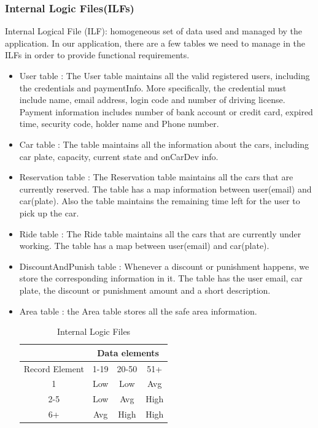 \documentclass{article}
\begin{document}
	\subsubsection{Internal Logic Files(ILFs)}
	Internal Logical File (ILF): homogeneous set of data used and managed by the application.
	In our application, there are a few tables we need to manage in the ILFs in order to provide functional requirements.
    \begin{itemize}
    	\item User table : The User table maintains all the valid registered users, including the credentials and paymentInfo. More specifically, the credential must include name, email address, login code and number of driving license. Payment information includes number of bank 
    	account or credit card, expired time, security code, holder name and Phone number.
    	
    	\item Car table : The table maintains all the information about the cars, including car plate, capacity, current state and onCarDev info. 
    	
    	\item Reservation table : The Reservation table maintains all the cars that are currently reserved. The table has a map information between user(email) and car(plate). Also the table maintains the remaining time left for the user to pick up the car.
    	
    	\item Ride table : The Ride table maintains all the cars that are currently under working. The table has a map between user(email) and car(plate). 
    	
    	\item DiscountAndPunish table : Whenever a discount or punishment happens, we store the corresponding information in it. The table has the user email, car plate, the discount or punishment amount and a short description.
    	
    	\item Area table : the Area table stores all the safe area information.
    	\begin{table}[h!]
    		\centering
    		\caption{Internal Logic Files}
    		\label{my-label}
    		\begin{tabular}{|c|c|c|c|}
    			\hline
    			& \multicolumn{3}{c|}{Data elements} \\ \hline
    			Record Element & 1-19      & 20-50      & 51+       \\ \hline
    			1              & Low       & Low        & Avg       \\ \hline
    			2-5            & Low       & Avg        & High      \\ \hline
    			6+             & Avg       & High       & High      \\ \hline   
    		\end{tabular}
    	\end{table}
    \end{itemize}
\end{document}
